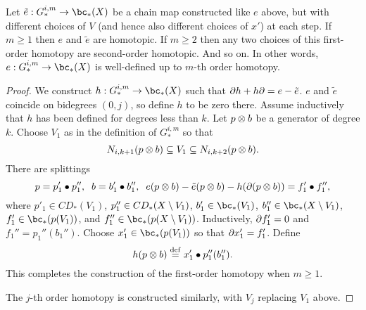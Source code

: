 

\begin{lemma} \label{m_order_hty}
Let $\tilde{e} :  G_*^{i,m} \to \bc_*(X)$ be a chain map constructed like $e$ above, but with
different choices of $V$ (and hence also different choices of $x'$) at each step.
If $m \ge 1$ then $e$ and $\tilde{e}$ are homotopic.
If $m \ge 2$ then any two choices of this first-order homotopy are second-order homotopic.
And so on.
In other words,  $e :  G_*^{i,m} \to \bc_*(X)$ is well-defined up to $m$-th order homotopy.
\end{lemma}

\begin{proof}
We construct $h: G_*^{i,m} \to \bc_*(X)$ such that $\partial h + h\partial = e - \tilde{e}$.
$e$ and $\tilde{e}$ coincide on bidegrees $(0, j)$, so define $h$
to be zero there.
Assume inductively that $h$ has been defined for degrees less than $k$.
Let $p\otimes b$ be a generator of degree $k$.
Choose $V_1$ as in the definition of $G_*^{i,m}$ so that
\[
	N_{i,k+1}(p\otimes b) \subseteq V_1 \subseteq N_{i,k+2}(p\otimes b) .
\]
There are splittings
\[
	p = p'_1\bullet p''_1 , \;\; b = b'_1\bullet b''_1 , 
			\;\; e(p\otimes b) - \tilde{e}(p\otimes b) - h(\partial(p\otimes b)) = f'_1\bullet f''_1 ,
\]
where $p'_1 \in CD_*(V_1)$, $p''_1 \in CD_*(X\setminus V_1)$, 
$b'_1 \in \bc_*(V_1)$, $b''_1 \in \bc_*(X\setmin V_1)$, 
$f'_1 \in \bc_*(p(V_1))$, and $f''_1 \in \bc_*(p(X\setmin V_1))$.
Inductively, $\partial f'_1 = 0$ and $f_1'' = p_1''(b_1'')$.
Choose $x'_1 \in \bc_*(p(V_1))$ so that $\partial x'_1 = f'_1$.
Define 
\[
	h(p\otimes b) \stackrel{\mathrm{def}}{=} x'_1 \bullet p''_1(b''_1) .
\]
This completes the construction of the first-order homotopy when $m \ge 1$.

The $j$-th order homotopy is constructed similarly, with $V_j$ replacing $V_1$ above.
\end{proof}

